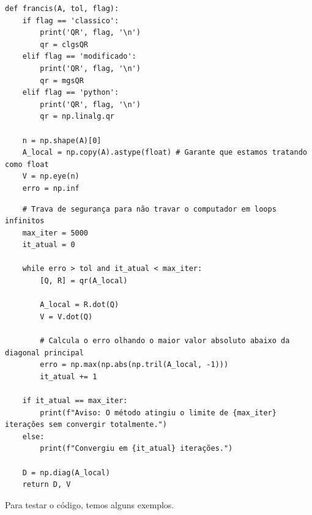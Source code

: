 \documentclass[../numerical_methods.tex]{subfiles}
\begin{document}
\begin{listing}[H]
	\begin{verbatim}
def francis(A, tol, flag):
    if flag == 'classico':
        print('QR', flag, '\n')
        qr = clgsQR
    elif flag == 'modificado':
        print('QR', flag, '\n')
        qr = mgsQR
    elif flag == 'python':
        print('QR', flag, '\n')
        qr = np.linalg.qr

    n = np.shape(A)[0]
    A_local = np.copy(A).astype(float) # Garante que estamos tratando como float
    V = np.eye(n)
    erro = np.inf
 \end{verbatim}
\end{listing}
\begin{listing}[H]
	\begin{verbatim}
    # Trava de segurança para não travar o computador em loops infinitos
    max_iter = 5000
    it_atual = 0

    while erro > tol and it_atual < max_iter:
        [Q, R] = qr(A_local)

        A_local = R.dot(Q)
        V = V.dot(Q)

        # Calcula o erro olhando o maior valor absoluto abaixo da diagonal principal
        erro = np.max(np.abs(np.tril(A_local, -1)))
        it_atual += 1

    if it_atual == max_iter:
        print(f"Aviso: O método atingiu o limite de {max_iter} iterações sem convergir totalmente.")
    else:
        print(f"Convergiu em {it_atual} iterações.")

    D = np.diag(A_local)
    return D, V

 \end{verbatim}
\end{listing}
Para testar o código, temos alguns exemplos.
\end{document}
